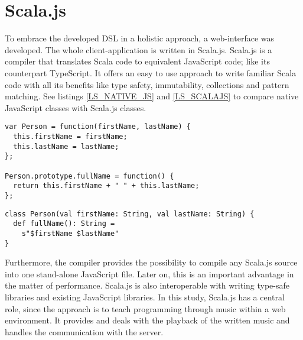 \section{Scala.js}
\label{THEO_SCALAJS}
To embrace the developed DSL in a holistic approach, a web-interface was developed. The whole client-application is written in Scala.js. Scala.js is a compiler that translates Scala code to equivalent JavaScript code; like its counterpart TypeScript. It offers an easy to use approach to write familiar Scala code with all its benefits like type safety, immutability, collections and pattern matching. See listings \ref{LS_NATIVE_JS} and \ref{LS_SCALAJS} to compare native JavaScript classes with Scala.js classes.\cite{ScJsDoc}

\begin{lstlisting}[caption={Native JavaScript Class Example}, label=LS_NATIVE_JS]
var Person = function(firstName, lastName) {
  this.firstName = firstName;
  this.lastName = lastName;
};

Person.prototype.fullName = function() {
  return this.firstName + " " + this.lastName;
};
\end{lstlisting}


\begin{lstlisting}[caption={Scala.js Class Example}, label=LS_SCALAJS]
class Person(val firstName: String, val lastName: String) {
  def fullName(): String =
    s"$firstName $lastName"
}
\end{lstlisting}

Furthermore, the compiler provides the possibility to compile any Scala.js source into one stand-alone JavaScript file. Later on, this is an important advantage in the matter of performance. Scala.js is also interoperable with writing type-safe libraries and existing JavaScript libraries. In this study, Scala.js has a central role, since the approach is to teach programming through music within a web environment. It provides and deals with the playback of the written music and handles the communication with the server.



